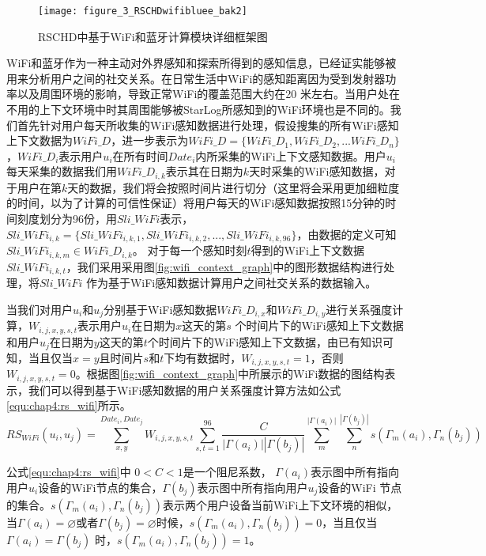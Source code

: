 \begin{figure}[htp]
\centering
\texttt{[image: figure\_3\_RSCHDwifibluee\_bak2]}
\caption{RSCHD中基于WiFi和蓝牙计算模块详细框架图}
\label{fig:7_1_wifi}
\end{figure}
\par WiFi和蓝牙作为一种主动对外界感知和探索所得到的感知信息，已经证实能够被用来分析用户之间的社交关系。在日常生活中WiFi的感知距离因为受到发射器功率以及周围环境的影响，导致正常WiFi的覆盖范围大约在20 米左右。当用户处在不用的上下文环境中时其周围能够被StarLog所感知到的WiFi环境也是不同的。我们首先针对用户每天所收集的WiFi感知数据进行处理，假设搜集的所有WiFi感知上下文数据为$WiFi\_D$，进一步表示为$WiFi\_D=\{  WiFi\_D_{1},WiFi\_D_{2},...WiFi\_D_{n}  \}$，$WiFi\_D_{i}$表示用户$u_{i}$在所有时间$Date_{i}$内所采集的WiFi上下文感知数据。用户$u_{i}$每天采集的数据我们用$WiFi\_D_{i,k}$表示其在日期为$k$天时采集的WiFi感知数据，对于用户在第$k$天的数据，我们将会按照时间片进行切分（这里将会采用更加细粒度的时间，以为了计算的可信性保证）将用户每天的WiFi感知数据按照15分钟的时间刻度划分为96份，用$Sli\_WiFi$表示，$Sli\_WiFi_{i,k}=\{Sli\_WiFi_{i,k,1},Sli\_WiFi_{i,k,2},...,Sli\_WiFi_{i,k,96}\}$，由数据的定义可知$Sli\_WiFi_{i,k,m} \in WiFi\_D_{i,k}$。 对于每一个感知时刻$t$得到的WiFi上下文数据$Sli\_WiFi_{i,k,t}$，我们采用采用图\ref{fig:wifi_context_graph}中的图形数据结构进行处理，将$Sli\_WiFi$ 作为基于WiFi感知数据计算用户之间社交关系的数据输入。

\par 当我们对用户$u_{i}$和$u_{j}$分别基于WiFi感知数据$WiFi\_D_{i,x}$和$WiFi\_D_{i,y}$进行关系强度计算，$W_{i,j,x,y,s,t}$表示用户$u_{i}$在日期为$x$这天的第$s$ 个时间片下的WiFi感知上下文数据和用户$u_{j}$在日期为$y$这天的第$t$个时间片下的WiFi感知上下文数据，由已有知识可知，当且仅当$x=y$且时间片$s$和$t$下均有数据时，$W_{i,j,x,y,s,t}=1$，否则$W_{i,j,x,y,s,t}=0$。根据图\ref{fig:wifi_context_graph}中所展示的WiFi数据的图结构表示，我们可以得到基于WiFi感知数据的用户关系强度计算方法如公式\ref{equ:chap4:rs_wifi}所示。
\begin{equation}
\label{equ:chap4:rs_wifi}
RS_{WiFi}(u_{i},u_{j})=\sum_{x ,y }^{ Date_{i}, Date_{j}}W_{i,j,x,y,s,t}\sum_{s,t=1}^{96} \frac{C}{ \left |\Gamma (a_{i})  \right |\left |\Gamma (b_{j})  \right | } \sum_{m}^{\left |\Gamma (a_{i})  \right |}  \sum_{n}^{\left |\Gamma (b_{j})  \right |}s(\Gamma_{m} (a_{i}),\Gamma_{n} (b_{j}))
\end{equation}
\par 公式\ref{equ:chap4:rs_wifi}中  $0< C<1$是一个阻尼系数， $\Gamma (a_{i}) $表示图中所有指向用户$u_{i}$设备的WiFi节点的集合，$\Gamma (b_{j}) $表示图中所有指向用户$u_{j}$设备的WiFi 节点的集合。$s(\Gamma_{m} (a_{i}),\Gamma_{n} (b_{j}))$表示两个用户设备当前WiFi上下文环境的相似，当$\Gamma (a_{i})= \varnothing  $或者$\Gamma (b_{j})=\varnothing $时候，$s(\Gamma_{m} (a_{i}),\Gamma_{n} (b_{j}))=0$，当且仅当$\Gamma (a_{i})=\Gamma (b_{j})$ 时，$s(\Gamma_{m} (a_{i}),\Gamma_{n} (b_{j}))=1$。

